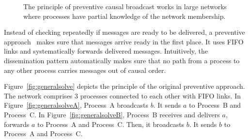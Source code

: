 \begin{figure*}
  \begin{center}
    
    \caption{\label{fig:disseminationtree}The principle of preventive causal
      broadcast works in large networks where processes have partial knowledge
      of the network membership.}
  \end{center}
\end{figure*}



Instead of checking repeatedly if messages are ready to be delivered, a
preventive approach~\cite{friedman2004causal} makes sure that messages arrive
ready in the first place.  It uses FIFO links and systematically forwards
delivered messages.  Intuitively, the dissemination pattern automatically makes
sure that no path from a process to any other process carries messages out of
causal order.

Figure~\ref{fig:generalsolve} depicts the principle of the original preventive
approach. The network comprises 3 processes connected to each other with FIFO
links.  In Figure~\ref{fig:generalsolveA}, Process~A broadcasts $b$. It sends
$a$ to Process~B and Process~C. In Figure~\ref{fig:generalsolveB}, Process~B
receives and delivers $a$, forwards $a$ to Process~A and Process~C. Then, it
broadcasts $b$. It sends $b$ to Process~A and Process~C. 

